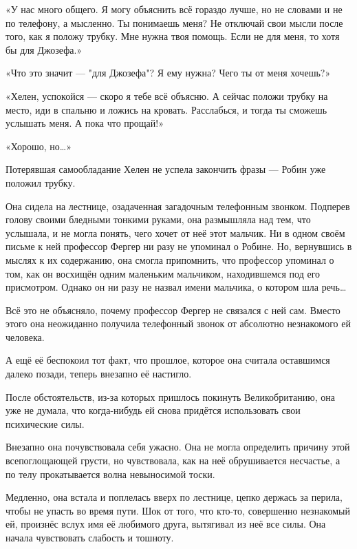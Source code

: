 \documentclass[a4paper,12pt]{book}
\begin{document}
\par
«У нас много общего. Я могу объяснить всё гораздо лучше, но не словами и не по телефону, а мысленно. Ты понимаешь меня? Не отключай свои мысли после того, как я положу трубку. Мне нужна твоя помощь. Если не для меня, то хотя бы для Джозефа.»
\par
«Что это значит — "для Джозефа"? Я ему нужна? Чего ты от меня хочешь?»
\par
«Хелен, успокойся — скоро я тебе всё объясню. А сейчас положи трубку на место, иди в спальню и ложись на кровать. Расслабься, и тогда ты сможешь услышать меня. А пока что прощай!»
\par
«Хорошо, но…»
\par
Потерявшая самообладание Хелен не успела закончить фразы — Робин уже положил трубку.\\
\par
Она сидела на лестнице, озадаченная загадочным телефонным звонком. Подперев голову своими бледными тонкими руками, она размышляла над тем, что услышала, и не могла понять, чего хочет от неё этот мальчик. Ни в одном своём письме к ней профессор Фергер ни разу не упоминал о Робине. Но, вернувшись в мыслях к их содержанию, она смогла припомнить, что профессор упоминал о том, как он восхищён одним маленьким мальчиком, находившемся под его присмотром. Однако он ни разу не назвал имени мальчика, о котором шла речь…
\par
Всё это не объясняло, почему профессор Фергер не связался с ней сам. Вместо этого она неожиданно получила телефонный звонок от абсолютно незнакомого ей человека.
\par
А ещё её беспокоил тот факт, что прошлое, которое она считала оставшимся далеко позади, теперь внезапно её настигло.
\par
После обстоятельств, из-за которых пришлось покинуть Великобританию, она уже не думала, что когда-нибудь ей снова придётся использовать свои психические силы.
\par
Внезапно она почувствовала себя ужасно. Она не могла определить причину этой всепоглощающей грусти, но чувствовала, как на неё обрушивается несчастье, а по телу прокатывается волна невыносимой тоски.
\par
Медленно, она встала и поплелась вверх по лестнице, цепко держась за перила, чтобы не упасть во время пути. Шок от того, что кто-то, совершенно незнакомый ей, произнёс вслух имя её любимого друга, вытягивал из неё все силы. Она начала чувствовать слабость и тошноту.\\
\par
\end{document}
